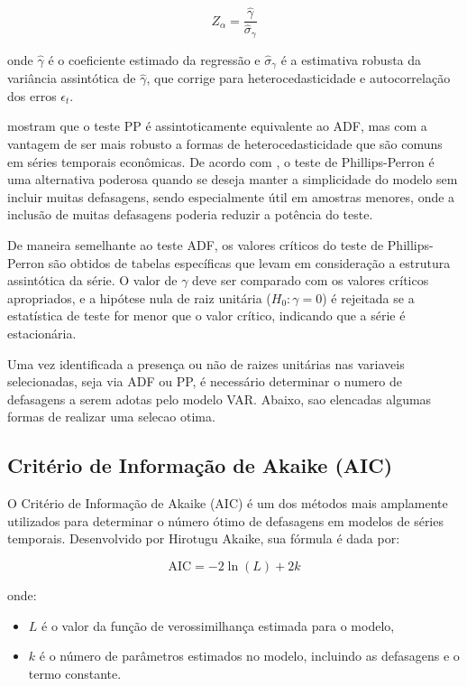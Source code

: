\documentclass[12pt,oneside,a4paper,chapter=TITLE,english,brazil,sumario=abnt-6027-2012]{abntex2}
\begin{document}
\begin{equation}
	Z_\alpha = \frac{\hat{\gamma}}{\widehat{\sigma}_{\gamma}}
\end{equation}

onde \( \hat{\gamma} \) é o coeficiente estimado da regressão e \( \widehat{\sigma}_{\gamma} \) é a estimativa robusta da variância assintótica de \( \hat{\gamma} \), que corrige para heterocedasticidade e autocorrelação dos erros \( \epsilon_t \).

 mostram que o teste PP é assintoticamente equivalente ao ADF, mas com a vantagem de ser mais robusto a formas de heterocedasticidade que são comuns em séries temporais econômicas. De acordo com , o teste de Phillips-Perron é uma alternativa poderosa quando se deseja manter a simplicidade do modelo sem incluir muitas defasagens, sendo especialmente útil em amostras menores, onde a inclusão de muitas defasagens poderia reduzir a potência do teste.

De maneira semelhante ao teste ADF, os valores críticos do teste de Phillips-Perron são obtidos de tabelas específicas que levam em consideração a estrutura assintótica da série. O valor de \( \gamma \) deve ser comparado com os valores críticos apropriados, e a hipótese nula de raiz unitária (\( H_0: \gamma = 0 \)) é rejeitada se a estatística de teste for menor que o valor crítico, indicando que a série é estacionária.

Uma vez identificada a presença ou não de raizes unitárias nas variaveis selecionadas, seja via ADF ou PP, é necessário determinar o numero de defasagens a serem adotas pelo modelo VAR. Abaixo, sao elencadas algumas formas de realizar uma selecao otima.

\subsection{Critério de Informação de Akaike (AIC)} \label{sec:aic}

O Critério de Informação de Akaike (AIC) é um dos métodos mais amplamente utilizados para determinar o número ótimo de defasagens em modelos de séries temporais. Desenvolvido por Hirotugu Akaike, sua fórmula é dada por:

\begin{equation}
	\text{AIC} = -2 \ln(L) + 2k
\end{equation}

onde:

\begin{itemize}
	\item \( L \) é o valor da função de verossimilhança estimada para o modelo,
	\item \( k \) é o número de parâmetros estimados no modelo, incluindo as defasagens e o termo constante.
\end{itemize}
\end{document}
